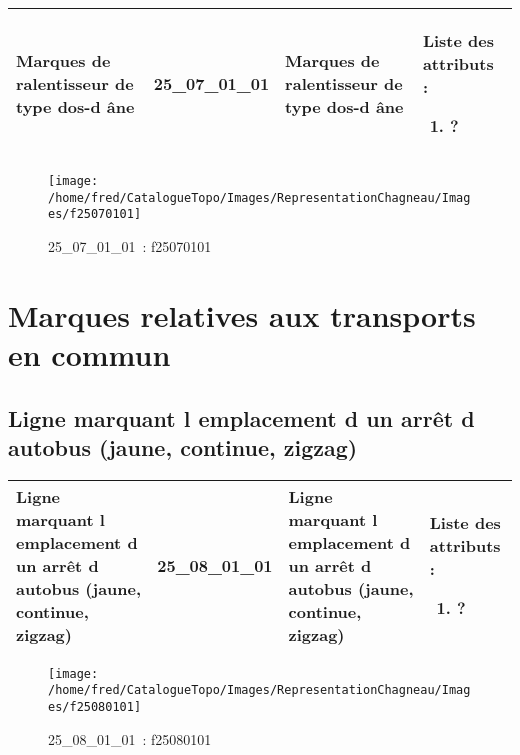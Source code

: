 \documentclass[12pt,titlepage]{book}
\begin{document}
\renewcommand{\arraystretch}{1.2}
\begin{supertabular}{|p{10cm}|c|p{13cm}|p{12cm}|}
 Marques de ralentisseur de type dos-d âne & 25\_07\_01\_01 & Marques de ralentisseur de type dos-d âne & Liste des attributs :
\begin{enumerate}
  \item ?\end{enumerate}
\\
\hline
\end{supertabular}
\begin{figure}[h!]
  \hfill         %
  \begin{minipage}[t]{3cm}
    \begin{center}
      \texttt{[image: /home/fred/CatalogueTopo/Images/RepresentationChagneau/Images/f25070101]}
      \caption[~25\_07\_01\_01]{\small{25\_07\_01\_01~:} \tiny{f25070101}}\label{f25070101}
    \end{center}
  \end{minipage}
\end{figure}

\section{\large Marques relatives aux transports en commun}
\subsection{Ligne marquant l emplacement d un arrêt d autobus (jaune, continue, zigzag)}
\noindent
\vspace{\baselineskip}

\renewcommand{\arraystretch}{1.2}
\begin{supertabular}{|p{10cm}|c|p{13cm}|p{12cm}|}
 Ligne marquant l emplacement d un arrêt d autobus (jaune, continue, zigzag) & 25\_08\_01\_01 & Ligne marquant l emplacement d un arrêt d autobus (jaune, continue, zigzag) & Liste des attributs :
\begin{enumerate}
  \item ?\end{enumerate}
\\
\hline
\end{supertabular}
\begin{figure}[h!]
  \hfill         %
  \begin{minipage}[t]{3cm}
    \begin{center}
      \texttt{[image: /home/fred/CatalogueTopo/Images/RepresentationChagneau/Images/f25080101]}
      \caption[~25\_08\_01\_01]{\small{25\_08\_01\_01~:} \tiny{f25080101}}\label{f25080101}
    \end{center}
  \end{minipage}
\end{figure}
\end{document}
